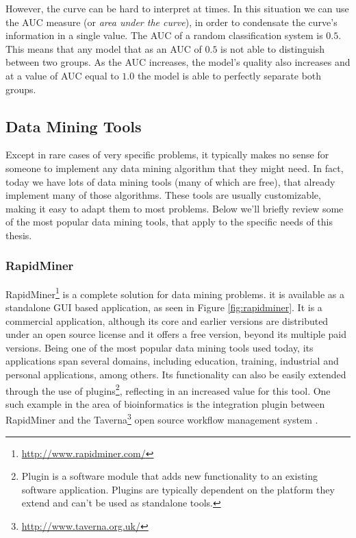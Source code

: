 However, the curve can be hard to interpret at times. In this situation we can
use the AUC measure (or \textit{area under the curve}), in order to condensate
the curve's information in a single value. The AUC of a random classification
system is $0.5$. This means that any model that as an AUC of $0.5$ is not able
to distinguish between two groups. As the AUC increases, the model's quality
also increases and at a value of AUC equal to $1.0$ the model is able to
perfectly separate both groups.

\subsection{Data Mining Tools}\label{sec:mintools}

Except in rare cases of very specific problems, it typically makes no sense for
someone to implement any data mining algorithm that they might need. In fact,
today we have lots of data mining tools (many of which are free), that already
implement many of those algorithms. These tools are usually customizable, making
it easy to adapt them to most problems. Below we'll briefly review some of the
most popular data mining tools, that apply to the specific needs of this thesis.

\subsubsection*{RapidMiner}

RapidMiner\footnote{\url{http://www.rapidminer.com/}} is a complete solution for
data mining problems. it is available as a standalone GUI based application, as
seen in Figure \ref{fig:rapidminer}. It is a commercial application, although
its core and earlier versions are distributed under an open source license and
it offers a free version, beyond its multiple paid versions. Being one of the
most popular data mining tools used today, its applications span several
domains, including education, training, industrial and personal applications,
among others. Its functionality can also be easily extended through the use of
plugins\footnote{Plugin is a software module that adds new functionality to an
existing software application. Plugins are typically dependent on the platform
they extend and can't be used as standalone tools.}, reflecting in an increased
value for this tool. One such example in the area of bioinformatics is the
integration plugin between RapidMiner and the
Taverna\footnote{\url{http://www.taverna.org.uk/}} open source workflow
management system \cite{Jupp2011}.

